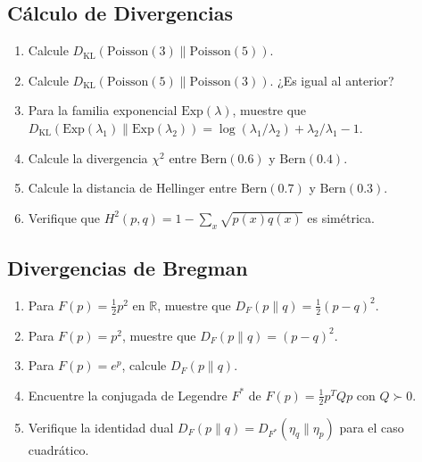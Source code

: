 \subsection*{Cálculo de Divergencias}
\begin{enumerate}[resume]
	\item[$\star$] Calcule $D_{\mathrm{KL}}(\mathrm{Poisson}(3) \| \mathrm{Poisson}(5))$.
	\item[$\star$] Calcule $D_{\mathrm{KL}}(\mathrm{Poisson}(5) \| \mathrm{Poisson}(3))$.  ¿Es igual al anterior?
	\item[$\star\star\star$] Para la familia exponencial $\mathrm{Exp}(\lambda)$, muestre que $D_{\mathrm{KL}}(\mathrm{Exp}(\lambda_1) \| \mathrm{Exp}(\lambda_2)) = \log(\lambda_1/\lambda_2) + \lambda_2/\lambda_1 - 1$.
	\item[$\star$] Calcule la divergencia $\chi^2$ entre $\mathrm{Bern}(0.6)$ y $\mathrm{Bern}(0.4)$.
	\item[$\star$] Calcule la distancia de Hellinger entre $\mathrm{Bern}(0.7)$ y $\mathrm{Bern}(0.3)$.
	\item[$\star\star$] Verifique que $H^2(p,q) = 1 - \sum_x \sqrt{p(x)q(x)}$ es simétrica.
\end{enumerate}

\subsection*{Divergencias de Bregman}
\begin{enumerate}[resume]
	\item[$\star$] Para $F(p) = \frac{1}{2}p^2$ en $\mathbb{R}$, muestre que $D_F(p \| q) = \frac{1}{2}(p-q)^2$.
	\item[$\star$] Para $F(p) = p^2$, muestre que $D_F(p \| q) = (p-q)^2$.
	\item[$\star$] Para $F(p) = e^p$, calcule $D_F(p \| q)$.
	\item[$\star\star$] Encuentre la conjugada de Legendre $F^*$ de $F(p) = \frac{1}{2}p^TQp$ con $Q \succ 0$.
	\item[$\star\star\star$] Verifique la identidad dual $D_F(p \| q) = D_{F^*}(\eta_q \| \eta_p)$ para el caso cuadrático.
\end{enumerate}

